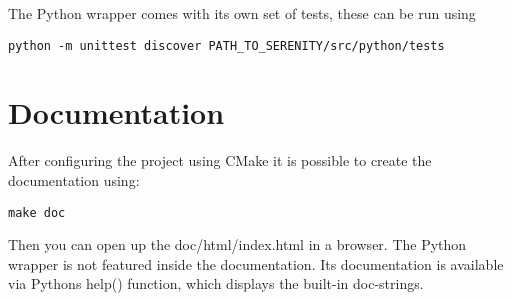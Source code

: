 The Python wrapper comes with its own set of tests, these can be run using
\begin{lstlisting}
python -m unittest discover PATH_TO_SERENITY/src/python/tests
\end{lstlisting}
\section{Documentation}
After configuring the project using CMake it is possible to create the documentation
using:
\begin{lstlisting}
make doc
\end{lstlisting}
Then you can open up the doc/html/index.html in a browser.
The Python wrapper is not featured inside the documentation.
Its documentation is available via Pythons help() function,
which displays the built-in doc-strings.

\clearpage